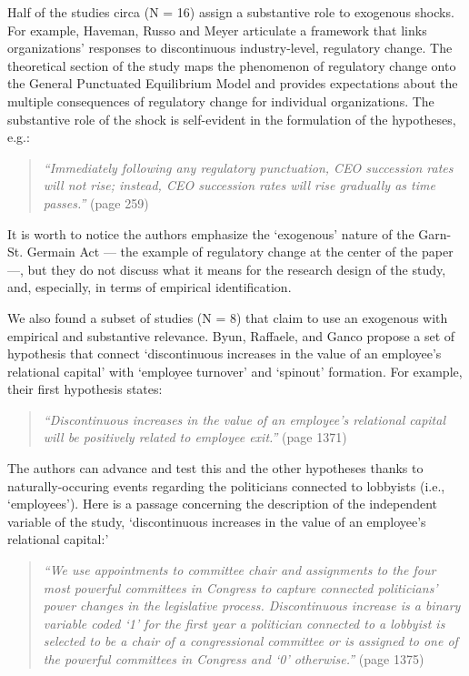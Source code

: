 \begin{refsection}
Half of the studies circa (N = 16) assign a substantive role to exogenous
shocks.  For example, Haveman, Russo and Meyer \parencite*{haveman2001253} 
articulate a framework that links organizations' responses to discontinuous
industry-level, regulatory change. The theoretical section of the study maps the
phenomenon of regulatory change onto the General Punctuated Equilibrium Model
and provides expectations about the multiple consequences of regulatory change
for individual organizations. The substantive role of the shock is self-evident
in the formulation of the hypotheses, e.g.:

\begin{quote}
  \textit{
    ``Immediately following any regulatory punctuation, CEO succession rates
    will not rise; instead, CEO succession rates will rise gradually as time
    passes.''
  }
  (page 259)
\end{quote}

It is worth to notice the authors emphasize the `exogenous' nature of the Garn-St.
Germain Act --- the example of regulatory change at the center of the paper 
---, but they do not discuss what it means for the research design of 
the study, and, especially, in terms of empirical identification.

We also found a subset of studies (N = 8) that claim to use an exogenous with
empirical and substantive relevance. Byun, Raffaele, and Ganco
\parencite{byun20191368} propose a set of hypothesis that connect `discontinuous
increases in the value of an employee's relational capital' with `employee
turnover' and `spinout' formation. For example, their first hypothesis states:

\begin{quote}
  \textit{
    ``Discontinuous increases in the value of an  employee's relational capital 
    will be positively related to employee exit.''
  }
  (page 1371)
\end{quote}

The authors can advance and test this and the other hypotheses thanks to
naturally-occuring events regarding the politicians connected to lobbyists
(i.e., `employees').  Here is a passage concerning the description of the
independent variable of the study, `discontinuous increases in the value of an
employee's relational capital:'

\begin{quote}
  \textit{
    ``We use appointments to committee chair and assignments to the four most
    powerful committees in Congress to capture connected politicians' power
    changes in the legislative process. Discontinuous increase is a binary
    variable coded `1' for the first year a politician connected to a lobbyist is
    selected to be a chair of a congressional committee or is assigned to one of
    the powerful committees in Congress and `0' otherwise.''
  }
  (page 1375)
\end{quote}


\end{refsection}

